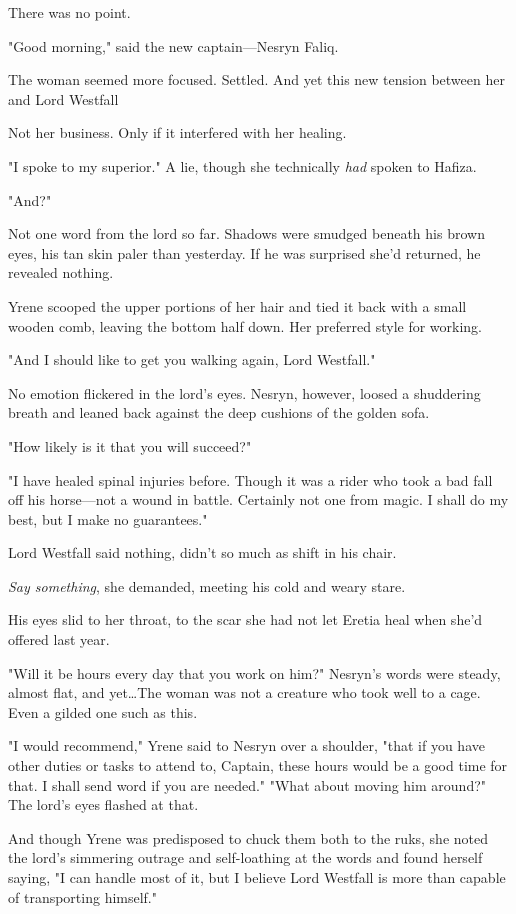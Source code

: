 There was no point.

"Good morning," said the new captain---Nesryn Faliq.

The woman seemed more focused.
Settled.
And yet this new tension between her and Lord Westfall 

Not her business.
Only if it interfered with her healing.

"I spoke to my superior."
A lie, though she technically \emph{had}
spoken to Hafiza.

"And?"

Not one word from the lord so far.
Shadows were smudged beneath his brown eyes, his tan skin paler than yesterday.
If he was surprised she'd returned, he revealed nothing.

Yrene scooped the upper portions of her hair and tied it back with a small wooden comb, leaving the bottom half down.
Her preferred style for working.

"And I should like to get you walking again, Lord Westfall."

No emotion flickered in the lord's eyes.
Nesryn, however, loosed a shuddering breath and leaned back against the deep cushions of the golden sofa.

"How likely is it that you will succeed?"

"I have healed spinal injuries before.
Though it was a rider who took a bad fall off his horse---not a wound in battle.
Certainly not one from magic.
I shall do my best, but I make no guarantees."

Lord Westfall said nothing, didn't so much as shift in his chair.

\emph{Say something}, she demanded, meeting his cold and weary stare.

His eyes slid to her throat, to the scar she had not let Eretia heal when she'd offered last year.

"Will it be hours every day that you work on him?"
Nesryn's words were steady, almost flat, and yet\ldots The woman was not a creature who took well to a cage.
Even a gilded one such as this.

"I would recommend," Yrene said to Nesryn over a shoulder, "that if you have other duties or tasks to attend to, Captain, these hours would be a good time for that.
I shall send word if you are needed."
"What about moving him around?"
The lord's eyes flashed at that.

And though Yrene was predisposed to chuck them both to the ruks, she noted the lord's simmering outrage and self-loathing at the words and found herself saying, "I can handle most of it, but I believe Lord Westfall is more than capable of transporting himself."

